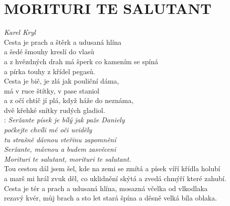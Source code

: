 \section*{\Huge MORITURI TE SALUTANT}
\emph{Karel Kryl}\\

Cesta je prach a štěrk a udusaná hlína\\
a šedé šmouhy kreslí do vlasů\\
a z hvězdných drah má šperk co kamením se spíná\\
a pírka touhy z křídel pegasů.\\

Cesta je bič, je zlá jak pouliční dáma,\\
má v ruce štítky, v pase staniol\\
a z očí chtíč jí plá, když háže do neznáma,\\
dvě křehké snítky rudých gladiol.\\

\textregistered: \emph{Seržante písek je bílý jak paže Daniely\\
počkejte chvíli mé oči uviděly\\
tu strašně dávnou vteřinu zapomnění\\
Seržante, mávnou a budem zasvěceni\\
Morituri te salutant, morituri te salutant.}\\

Tou cestou dál jsem šel, kde na zemi se zmítá a písek víří křídla holubí\\
a marš mi hrál zvuk děl, co uklidnění skýtá a zvedá chmýří které zahubí.\\

Cesta je tér a prach a udusaná hlína, mosazná včelka od vlkodlaka\\
rezavý kvér, můj brach a sto let stará špína a děsně velká bíla oblaka. \textregistered

\newpage
